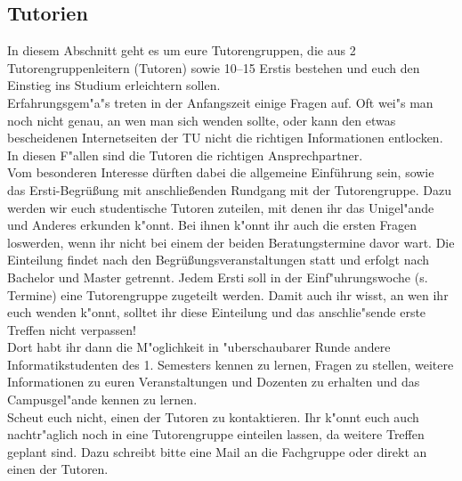 \subsection{Tutorien}



In diesem Abschnitt geht es um eure Tutorengruppen, die aus 2 Tutorengruppenleitern (Tutoren) sowie 10--15 Erstis bestehen und euch den Einstieg ins Studium erleichtern sollen.\\
Erfahrungsgem"a"s treten in der Anfangszeit einige Fragen auf. Oft wei"s man noch nicht genau, an wen man sich wenden sollte, oder kann den etwas bescheidenen Internetseiten der TU nicht die richtigen Informationen entlocken. In diesen F"allen sind die Tutoren die richtigen Ansprechpartner.\\

Vom besonderen Interesse dürften dabei die allgemeine Einführung sein,
sowie das Ersti-Begrüßung mit anschließenden Rundgang mit der
Tutorengruppe.
Dazu werden wir euch %
studentische 
Tutoren zuteilen, mit denen ihr das Unigel"ande und Anderes erkunden 
k"onnt. Bei ihnen k"onnt ihr auch die ersten Fragen loswerden, wenn 
ihr nicht bei einem der beiden Beratungstermine davor wart.
Die Einteilung findet nach den Begrüßungsveranstaltungen statt und erfolgt nach
Bachelor und Master getrennt.
Jedem Ersti soll in der Einf"uhrungswoche (s. Termine) eine Tutorengruppe zugeteilt werden. Damit auch ihr wisst, an wen ihr euch wenden k"onnt, solltet ihr diese Einteilung und das anschlie"sende erste Treffen nicht verpassen!\\
Dort habt ihr dann die M"oglichkeit in "uberschaubarer Runde andere Informatikstudenten des 1. Semesters kennen zu lernen, Fragen zu stellen, weitere Informationen zu euren Veranstaltungen und Dozenten zu erhalten und das Campusgel"ande kennen zu lernen.\\
Scheut euch nicht, einen der Tutoren zu kontaktieren. Ihr k"onnt euch auch nachtr"aglich noch in eine Tutorengruppe einteilen lassen, da weitere Treffen geplant sind. Dazu schreibt bitte eine Mail an die Fachgruppe  oder direkt an einen der Tutoren.\\

